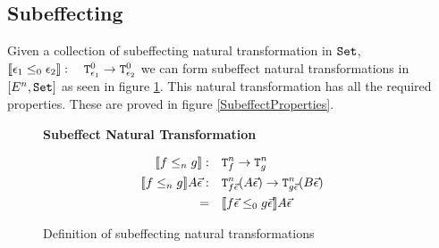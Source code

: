    
    
    \subsection{Subeffecting}
    Given a collection of subeffecting natural transformation in $\texttt{Set}$, ${\bf [\![}\epsilon_1\leq_{0} \epsilon_2{\bf ]\!]}: \quad \texttt{T}^0_{\epsilon_1} \rightarrow \texttt{T}^0_{\epsilon_2}$ we can form subeffect natural transformations in $[E^n, \texttt{Set}]$ as seen in figure \ref{SubEffecting}. This natural transformation has all the required properties. These are proved in figure \ref{SubeffectProperties}.
    
    \begin{figure}
        \begin{framed}
            \centering\textbf{Subeffect Natural Transformation}
        
            \begin{align*}
                {\bf [\![}f\leq_{n} g{\bf ]\!]}:&\quad\texttt{T}^n_{f}\rightarrow \texttt{T}^n_{g}\\
                {\bf [\![}f\leq_{n} g{\bf ]\!]} A \vec{\epsilon}:&\quad\texttt{T}^n_{f\vec{\epsilon}}(A\vec{\epsilon})\rightarrow \texttt{T}^n_{g\vec{\epsilon}}(B\vec{\epsilon})\\
                =&\quad {\bf [\![}f\vec{\epsilon}\leq_{0} g\vec{\epsilon}{\bf ]\!]}A\vec{\epsilon}
            \end{align*}
        \end{framed}
        \caption{Definition of subeffecting natural transformations}
        \label{SubEffecting}
    \end{figure}
    
